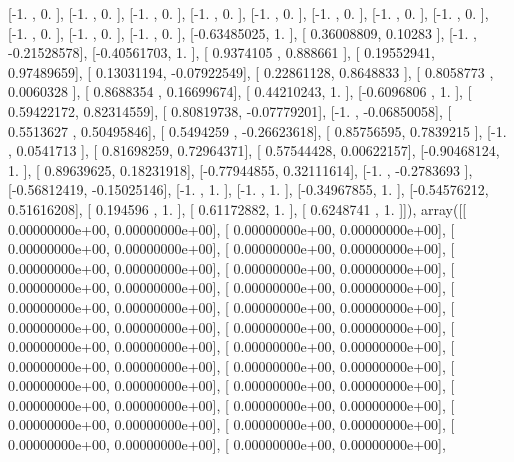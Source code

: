 \documentclass{article}
\begin{document}
       [-1.        ,  0.        ],
       [-1.        ,  0.        ],
       [-1.        ,  0.        ],
       [-1.        ,  0.        ],
       [-1.        ,  0.        ],
       [-1.        ,  0.        ],
       [-1.        ,  0.        ],
       [-1.        ,  0.        ],
       [-1.        ,  0.        ],
       [-1.        ,  0.        ],
       [-1.        ,  0.        ],
       [-0.63485025,  1.        ],
       [ 0.36008809,  0.10283   ],
       [-1.        , -0.21528578],
       [-0.40561703,  1.        ],
       [ 0.9374105 ,  0.888661  ],
       [ 0.19552941,  0.97489659],
       [ 0.13031194, -0.07922549],
       [ 0.22861128,  0.8648833 ],
       [ 0.8058773 ,  0.0060328 ],
       [ 0.8688354 ,  0.16699674],
       [ 0.44210243,  1.        ],
       [-0.6096806 ,  1.        ],
       [ 0.59422172,  0.82314559],
       [ 0.80819738, -0.07779201],
       [-1.        , -0.06850058],
       [ 0.5513627 ,  0.50495846],
       [ 0.5494259 , -0.26623618],
       [ 0.85756595,  0.7839215 ],
       [-1.        ,  0.0541713 ],
       [ 0.81698259,  0.72964371],
       [ 0.57544428,  0.00622157],
       [-0.90468124,  1.        ],
       [ 0.89639625,  0.18231918],
       [-0.77944855,  0.32111614],
       [-1.        , -0.2783693 ],
       [-0.56812419, -0.15025146],
       [-1.        ,  1.        ],
       [-1.        ,  1.        ],
       [-0.34967855,  1.        ],
       [-0.54576212,  0.51616208],
       [ 0.194596  ,  1.        ],
       [ 0.61172882,  1.        ],
       [ 0.6248741 ,  1.        ]]), array([[  0.00000000e+00,   0.00000000e+00],
       [  0.00000000e+00,   0.00000000e+00],
       [  0.00000000e+00,   0.00000000e+00],
       [  0.00000000e+00,   0.00000000e+00],
       [  0.00000000e+00,   0.00000000e+00],
       [  0.00000000e+00,   0.00000000e+00],
       [  0.00000000e+00,   0.00000000e+00],
       [  0.00000000e+00,   0.00000000e+00],
       [  0.00000000e+00,   0.00000000e+00],
       [  0.00000000e+00,   0.00000000e+00],
       [  0.00000000e+00,   0.00000000e+00],
       [  0.00000000e+00,   0.00000000e+00],
       [  0.00000000e+00,   0.00000000e+00],
       [  0.00000000e+00,   0.00000000e+00],
       [  0.00000000e+00,   0.00000000e+00],
       [  0.00000000e+00,   0.00000000e+00],
       [  0.00000000e+00,   0.00000000e+00],
       [  0.00000000e+00,   0.00000000e+00],
       [  0.00000000e+00,   0.00000000e+00],
       [  0.00000000e+00,   0.00000000e+00],
       [  0.00000000e+00,   0.00000000e+00],
       [  0.00000000e+00,   0.00000000e+00],
       [  0.00000000e+00,   0.00000000e+00],
       [  0.00000000e+00,   0.00000000e+00],
\end{document}
